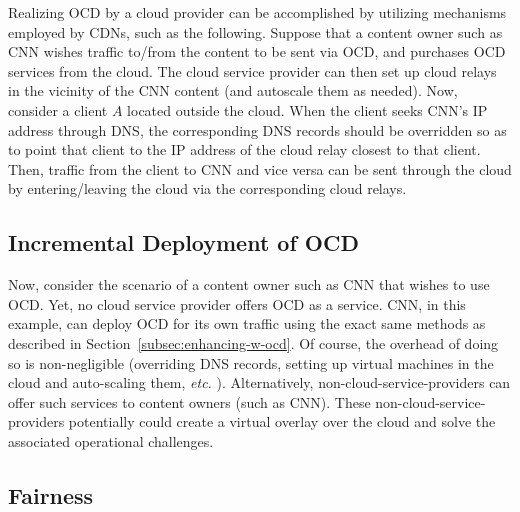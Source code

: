\documentclass[newfonts=false,format=sigconf,10pt,letterpaper]{acmart}
\providecommand{\etc}{\emph{etc.} }
\begin{document}
Realizing OCD by a cloud provider can be accomplished by utilizing mechanisms employed by CDNs, such as the following. Suppose that a content owner such as CNN wishes traffic to/from the content to be sent via OCD, and purchases OCD services from the cloud. The cloud service provider can then set up cloud relays in the vicinity of the CNN content (and autoscale them as needed). Now, consider a client $A$ located outside the cloud. When the client seeks CNN's IP address through DNS, the corresponding DNS records should be overridden so as to point that client to the IP address of the cloud relay closest to that client. Then, traffic from the client to CNN and vice versa can be sent through the cloud by entering/leaving the cloud via the corresponding cloud relays.

\subsection{Incremental Deployment of OCD}

Now, consider the scenario of a content owner such as CNN that wishes to use OCD. Yet, no cloud service provider offers OCD as a service. CNN, in this example, can deploy OCD for its own traffic using the exact same methods as described in Section~\ref{subsec:enhancing-w-ocd}. Of course, the overhead of doing so is non-negligible (overriding DNS records, setting up virtual machines in the cloud and auto-scaling them, \etc). Alternatively, non-cloud-service-providers can offer such services to content owners (such as CNN). These non-cloud-service-providers potentially could create a virtual overlay over the cloud and solve the associated operational challenges.

\subsection{Fairness}
\end{document}

